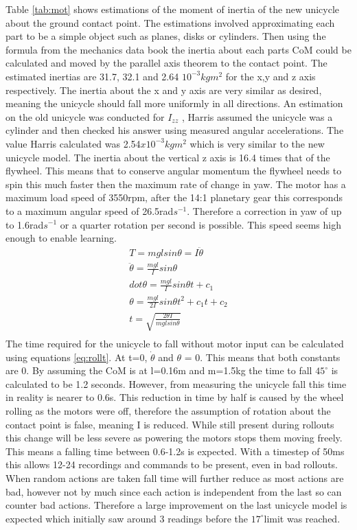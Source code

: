 \documentclass[twoside,twocolumn,12pt]{article}
\begin{document}
Table \ref{tab:mot} shows estimations of the moment of inertia of the new unicycle about the ground contact point. The estimations involved approximating each part to be a simple object such as planes, disks or cylinders. Then using the formula from the mechanics data book the inertia about each parts CoM could be calculated and moved by the parallel axis theorem to the contact point. The estimated inertias are 31.7, 32.1 and 2.64 $10^{-3}kgm^2$  for the x,y and z axis respectively. The inertia about the x and y axis are very similar as desired, meaning the unicycle should fall more uniformly in all directions. An estimation on the old unicycle was conducted for $I_{zz}$ \cite{arsalan}, Harris assumed the unicycle was a cylinder and then checked his answer using measured angular accelerations. The value Harris calculated was 2.54$x10^{-3}kgm^2$ which is very similar to the new unicycle model.
\newline
The inertia about the vertical z axis is 16.4 times that of the flywheel. This means that to conserve angular momentum the flywheel needs to spin this much faster then the maximum rate of change in yaw. The motor has a maximum load speed of 3550rpm, after the 14:1 planetary gear this corresponds to a maximum angular speed of 26.5rad$s^{-1}$. Therefore a correction in yaw of up to 1.6rad$s^{-1}$ or a quarter rotation per second is possible. This speed seems high enough to enable learning.
\begin{equation}
\begin{split}
T = mgl sin\theta = I\ddot{\theta} \\
\ddot{\theta} = \frac{mgl}{I}sin\theta\\
dot{\theta} = \frac{mgl}{I}sin\theta t + c_1\\
\theta = \frac{mgl}{2I}sin\theta t^2 + c_1t + c_2\\
t = \sqrt{\frac{2\theta I}{mglsin\theta}} \\
\end{split}
\label{eq:rollt}
\end{equation}
The time required for the unicycle to fall without motor input can be calculated using equations \ref{eq:rollt}. At t=0, $\dot{\theta}$ and $\theta$ = 0. This means that both constants are 0. By assuming the CoM is at l=0.16m and m=1.5kg the time to fall $45^{\circ}$ is calculated to be 1.2 seconds. However, from measuring the unicycle fall this time in reality is nearer to 0.6s. This reduction in time by half is caused by the wheel rolling as the motors were off, therefore the assumption of rotation about the contact point is false, meaning I is reduced. While still present during rollouts this change will be less severe as powering the motors stops them moving freely. This means a falling time between 0.6-1.2s is expected. With a timestep of 50ms this allows 12-24 recordings and commands to be present, even in bad rollouts. When random actions are taken fall time will further reduce as most actions are bad, however not by much since each action is independent from the last so can counter bad actions. Therefore a large improvement on the last unicycle model is expected which initially saw around 3 readings before the $17^{\circ}$limit was reached.
\end{document}
